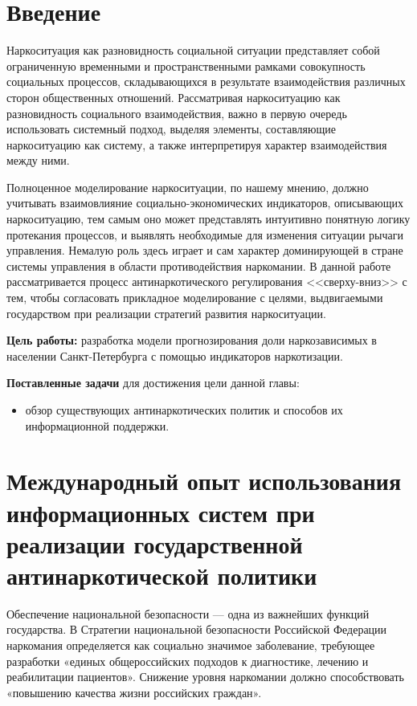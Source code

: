 \section*{Введение}

Наркоситуация как разновидность социальной ситуации представляет собой 
ограниченную временными и пространственными рамками совокупность социальных 
процессов, складывающихся в результате взаимодействия различных сторон 
общественных отношений.  Рассматривая наркоситуацию как разновидность 
социального взаимодействия, важно в первую очередь использовать системный 
подход, выделяя элементы, составляющие наркоситуацию как систему, а также 
интерпретируя характер взаимодействия между ними.

Полноценное моделирование наркоситуации, по нашему мнению, должно учитывать 
взаимовлияние социально-экономических индикаторов, описывающих наркоситуацию, 
тем самым оно может представлять интуитивно понятную логику протекания 
процессов, и выявлять необходимые для изменения ситуации рычаги управления.  
Немалую роль здесь играет и сам характер доминирующей в стране системы 
управления в области противодействия наркомании.  В данной работе 
рассматривается процесс антинаркотического регулирования <<сверху-вниз>> с тем, 
чтобы согласовать прикладное моделирование с целями, выдвигаемыми государством 
при реализации стратегий развития наркоситуации.

\textbf{Цель работы:} разработка модели прогнозирования доли наркозависимых в 
населении Санкт-Петербурга с помощью индикаторов наркотизации.

\textbf{Поставленные задачи} для достижения цели данной главы:
\begin{itemize}
    \item обзор существующих антинаркотических политик и способов их 
        информационной поддержки.
\end{itemize} 



\newpage
\section{Международный опыт использования информационных систем при реализации 
    государственной антинаркотической политики}

Обеспечение национальной безопасности — одна из важнейших функций государства.  
В Стратегии национальной безопасности Российской Федерации 
\cite{ru_nat_def_strat} наркомания определяется как социально значимое 
заболевание, требующее разработки «единых общероссийских подходов к диагностике, 
лечению и реабилитации пациентов».  Снижение уровня наркомании должно 
способствовать «повышению качества жизни российских граждан».

